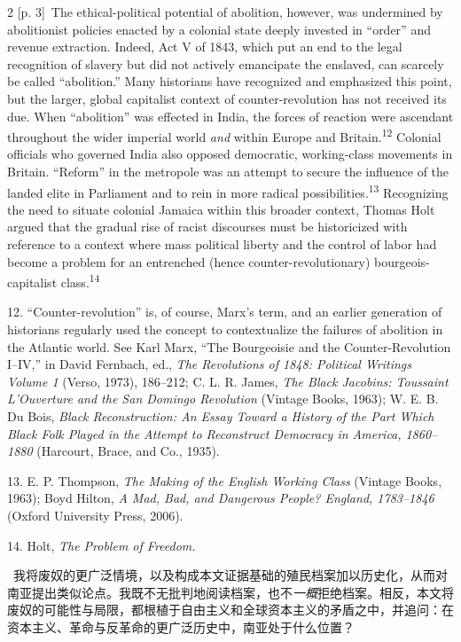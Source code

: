 \documentclass[10pt,a4paper]{article}
\begin{document}
\begin{paracol}{2}
{\scriptsize\color{gray} [p. 3]}\ The ethical-political potential of abolition, however, was undermined by abolitionist policies enacted by a colonial state deeply invested in “order” and revenue extraction. Indeed, Act V of 1843, which put an end to the legal recognition of slavery but did not actively emancipate the enslaved, can scarcely be called “abolition.” Many historians have recognized and emphasized this point, but the larger, global capitalist context of counter-revolution has not received its due. When “abolition” was effected in India, the forces of reaction were ascendant throughout the wider imperial world \textit{and} within Europe and Britain.\nobreak\textsuperscript{12} Colonial officials who governed India also opposed democratic, working-class movements in Britain. “Reform” in the metropole was an attempt to secure the influence of the landed elite in Parliament and to rein in more radical possibilities.\nobreak\textsuperscript{13} Recognizing the need to situate colonial Jamaica within this broader context, Thomas Holt argued that the gradual rise of racist discourses must be historicized with reference to a context where mass political liberty and the control of labor had become a problem for an entrenched (hence counter-revolutionary) bourgeois-capitalist class.\nobreak\textsuperscript{14}\par{\small 12. “Counter-revolution” is, of course, Marx’s term, and an earlier generation of historians regularly used the concept to contextualize the failures of abolition in the Atlantic world. See Karl Marx, “The Bourgeoisie and the Counter-Revolution I–IV,” in David Fernbach, ed., \textit{The Revolutions of 1848: Political Writings Volume 1} (Verso, 1973), 186–212; C. L. R. James, \textit{The Black Jacobins: Toussaint L’Ouverture and the San Domingo Revolution} (Vintage Books, 1963); W. E. B. Du Bois, \textit{Black Reconstruction: An Essay Toward a History of the Part Which Black Folk Played in the Attempt to Reconstruct Democracy in America, 1860–1880} (Harcourt, Brace, and Co., 1935).\par}{\small 13. E. P. Thompson, \textit{The Making of the English Working Class} (Vintage Books, 1963); Boyd Hilton, \textit{A Mad, Bad, and Dangerous People? England, 1783–1846} (Oxford University Press, 2006).\par}{\small 14. Holt, \textit{The Problem of Freedom.}\par}
\switchcolumn*
{\scriptsize\color{gray} [p. 4]}\ 我将废奴的更广泛情境，以及构成本文证据基础的殖民档案加以历史化，从而对南亚提出类似论点。我既不无批判地阅读档案，也不\textit{一概}拒绝档案。相反，本文将废奴的可能性与局限，都根植于自由主义和全球资本主义的矛盾之中，并追问：在资本主义、革命与反革命的更广泛历史中，南亚处于什么位置？\par

\end{paracol}
\end{document}

